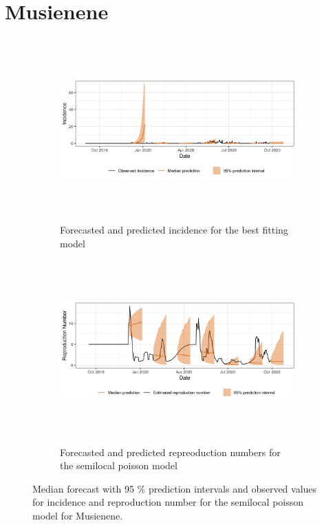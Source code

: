  \section{ Musienene }\begin{figure}[H]\begin{subfigure}{\textwidth}  \centering  \includegraphics[width=0.9\linewidth, height=7cm]{../output/Musienene_predictions.png}  \caption{Forecasted and predicted incidence for the best fitting model}\end{subfigure}

\begin{subfigure}{\textwidth}  \centering  \includegraphics[width=0.9\linewidth, height=7cm]{../output/Musienene_Rs.png}  \caption{Forecasted and predicted repreoduction numbers for the semilocal poisson model}\end{subfigure}  \caption{Median forecast with 95 \% prediction intervals and observed values for incidence and reproduction number for the semilocal poisson model for Musienene.}\end{figure}

